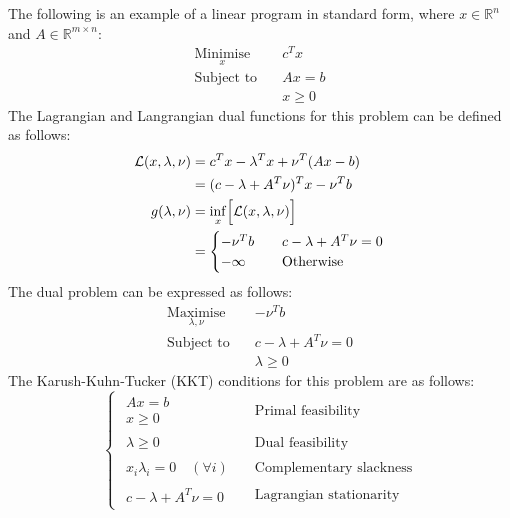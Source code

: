 The following is an example of a linear program in standard form, where $x\in\mathbb{R}^n$ and $A\in\mathbb{R}^{m\times n}$:
\begin{align*}
    \underset{x}{\text{Minimise}} \quad & c^Tx \\
    \text{Subject to} \quad & Ax = b \\
    & x \ge 0
\end{align*}
The Lagrangian and Langrangian dual functions for this problem can be defined as follows:
\begin{align*}
    \mathcal{L}(x, \lambda, \nu) &= c^Tx - \lambda^T x + \nu^T(Ax - b) \\
    &= (c - \lambda + A^T\nu)^T x - \nu^Tb \\
    g(\lambda, \nu) &= \underset{x}{\inf}\Bigl[ \mathcal{L}(x, \lambda, \nu) \Bigr] \\
    &= \begin{cases}
        -\nu^Tb \quad & c - \lambda + A^T\nu = 0 \\
        -\infty & \text{Otherwise}
    \end{cases}
\end{align*}
The dual problem can be expressed as follows:
\begin{align*}
    \underset{\lambda, \nu}{\text{Maximise}} \quad & -\nu^Tb \\
    \text{Subject to} \quad & c - \lambda + A^T\nu = 0 \\
    & \lambda \ge 0
\end{align*}
The Karush-Kuhn-Tucker (KKT) conditions for this problem are as follows:
\begin{equation*}
    \begin{cases}
        \begin{array}{l} Ax = b \\ x \ge 0 \end{array} & \text{Primal feasibility} \\
        \begin{array}{l} \lambda \ge 0 \end{array} & \text{Dual feasibility} \\
        \begin{array}{l} x_i\lambda_i = 0 \quad (\forall i) \end{array} & \text{Complementary slackness} \\
        \begin{array}{l} c - \lambda + A^T\nu = 0 \end{array} \quad & \text{Lagrangian stationarity}
    \end{cases}
\end{equation*}
